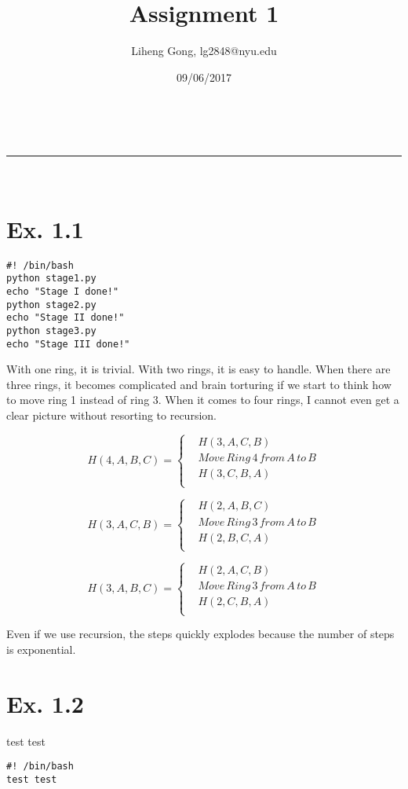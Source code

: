 \documentclass[a4paper,11pt]{article}
\makeatletter
\newcommand{\linia}{\rule{\linewidth}{0.5pt}}
\theoremstyle{mytheor}
\renewcommand{\maketitle}{
\begin{center}
\vspace{2ex}
{\huge \textsc{\@title}}
\vspace{1ex}
\\
\linia\\
\@author \hfill \@date
\vspace{4ex}
\end{center}
}
\makeatother
\begin{document}
\title{Assignment \textnumero{} 1}

\author{Liheng Gong, lg2848@nyu.edu}

\date{09/06/2017}

\maketitle

\section*{Ex. 1.1}

\begin{lstlisting}[label={list:first},caption=Sample Bash code.]
#! /bin/bash
python stage1.py
echo "Stage I done!"
python stage2.py
echo "Stage II done!"
python stage3.py
echo "Stage III done!"
\end{lstlisting}

With one ring, it is trivial. With two rings, it is easy to handle. When there are three rings, it becomes complicated and brain torturing if we start to think how to move ring 1 instead of ring 3. When it comes to four rings, I cannot even get a clear picture without resorting to recursion.

$$H(4,A,B,C)=\left\{
\begin{aligned}
&H(3,A,C,B) \\
&Move\, Ring\, 4\, from\, A\, to\, B\\
&H(3,C,B,A) \\
\end{aligned}
\right.
$$

$$H(3,A,C,B)=\left\{
\begin{aligned}
&H(2,A,B,C) \\
&Move\, Ring\, 3\, from\, A\, to\, B\\
&H(2,B,C,A) \\
\end{aligned}
\right.
$$

$$H(3,A,B,C)=\left\{
\begin{aligned}
&H(2,A,C,B) \\
&Move\, Ring\, 3\, from\, A\, to\, B\\
&H(2,C,B,A) \\
\end{aligned}
\right.
$$

Even if we use recursion, the steps quickly explodes because the number of steps is exponential.


\section*{Ex. 1.2}
test test
\begin{lstlisting}[label={list:second},caption=Sample Bash code.]
#! /bin/bash
test test
\end{lstlisting}
\end{document}
